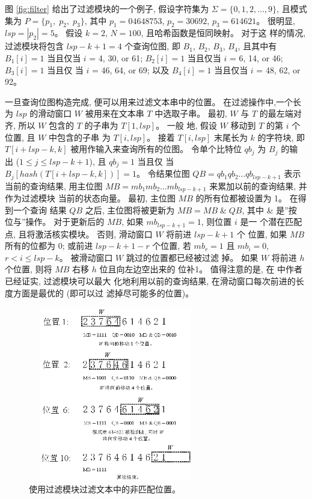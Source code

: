 图 \ref{fig:filter} 给出了过滤模块的一个例子, 假设字符集为
$\Sigma = \{0, 1, 2, \dots, 9\}$, 且模式集为 $P = \{p_1,\; p_2,\;
p_3\}$, 其中 $p_1 = 04648753$, $p_2 = 30692$, $p_3 = 614621$。 很明显,
$lsp = |p_2|= 5$。 假设 $k = 2$, $N = 100$, 且哈希函数是恒同映射。 对于这
样的情况, 过滤模块将包含 $lsp - k + 1 = 4$ 个查询位图, 即 $B_1$,
$B_2$, $B_3$, $B_4$, 且其中有 $B_1[i] = 1$ 当且仅当 $i$ = 4, 30, or
61; $B_2[i] = 1$ 当且仅当 $i$ = 6, 14, or 46; $B_3[i] = 1$ 当且仅
当 $i$ = 46, 64, or 69; 以及 $B_4[i] = 1$ 当且仅当 $i$ = 48, 62, or
92。

一旦查询位图构造完成, 便可以用来过滤文本串中的位置。 在过滤操作中,一个长
为 $lsp$ 的滑动窗口 $W$ 被用来在文本串 $T$ 中选取子串。 最初,
$W$ 与 $T$ 的最左端对齐, 所以 $W$ 包含的 $T$ 的子串为 $T[1,lsp]$。 一般
地, 假设 $W$ 移动到 $T$ 的第 $i$ 个位置, 且 $W$ 中包含的子串
为 $T[i,lsp]$。 接着 $T[i,lsp]$ 末尾长为 $k$ 的字符块, 即 $T[i+lsp-k,
k]$ 被用作输入来查询所有的位图。 令单个比特位 $qb_j$ 为 $B_j$ 的输
出 ($1 \leq j \leq lsp - k + 1$), 且 $qb_j=1$ 当且仅
当 $B_j[hash(T[i+lsp-k,k])] = 1$。 令结果位图
$QB = qb_1qb_2 \dots qb_{lsp-k+1}$ 表示当前的查询结果, 用主位图
$MB = mb_1mb_2 \dots mb_{lsp-k+1}$ 来累加以前的查询结果, 并作为过滤模块
当前的状态向量。 最初, 主位图 $MB$ 的所有位都被设置为 1。 在得到一个查询
结果 $QB$ 之后, 主位图将被更新为 $MB = MB \; \& \; QB$, 其中 \& 是''按
位与''操作。 对于更新后的 $MB$, 如果 $mb_{lsp-k+1} = 1$, 则位置 $i$ 是一
个潜在匹配点, 且将激活核实模块。 否则, 滑动窗口 $W$ 将前进 $lsp-k+1$ 个
位置, 如果 $MB$ 所有的位都为 0; 或前进 $lsp-k+1-r$ 个位置, 若 $mb_r=1$
且 $mb_i=0$, $r < i \leq lsp-k$。 被滑动窗口 $W$ 跳过的位置都已经被过滤
掉。  如果 $W$ 将前进 $h$ 个位置, 则将 $MB$ 右移 $h$ 位且向左边空出来的
位补1。 值得注意的是, 在 \cite{Lee2013} 中作者已经证实, 过滤模块可以最大
化地利用以前的查询结果, 在滑动窗口每次前进的长度方面是最优的 (即可以过
滤掉尽可能多的位置)。

\begin{figure}[H]
  \centering
  \includegraphics[height=3in, width=3in]{figures/2_MPM/filtering}
  \caption{使用过滤模块过滤文本中的非匹配位置。}
  \label{fig:f_match}
\end{figure}

